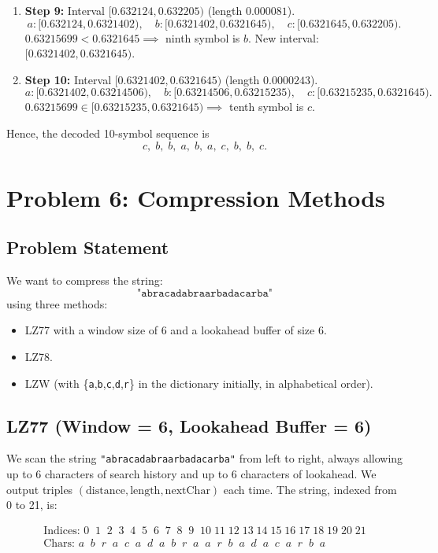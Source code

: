 \documentclass{article}
\begin{document}
\begin{enumerate}
\item \textbf{Step 9:} Interval $[0.632124,0.632205)$ (length $0.000081$).  
  \[
    a:[0.632124,0.6321402),\quad b:[0.6321402,0.6321645),\quad c:[0.6321645,0.632205).
  \]
  $0.63215699 < 0.6321645\implies$ ninth symbol is $b$.  
  New interval: $[0.6321402,0.6321645)$.

\item \textbf{Step 10:} Interval $[0.6321402,0.6321645)$ (length $0.0000243$).  
  \[
    a:[0.6321402,0.63214506),\quad b:[0.63214506,0.63215235),\quad c:[0.63215235,0.6321645).
  \]
  $0.63215699 \in [0.63215235,0.6321645)\implies$ tenth symbol is $c$.
\end{enumerate}

Hence, the decoded 10-symbol sequence is
\[
c,\; b,\; b,\; a,\; b,\; a,\; c,\; b,\; b,\; c.
\]

\section{Problem 6: Compression Methods}

\subsection{Problem Statement}
We want to compress the string:
\[
\texttt{"abracadabraarbadacarba"}
\]
using three methods:
\begin{itemize}
  \item LZ77 with a window size of 6 and a lookahead buffer of size 6.
  \item LZ78.
  \item LZW (with \{\texttt{a},\texttt{b},\texttt{c},\texttt{d},\texttt{r}\} in the dictionary initially, in alphabetical order).
\end{itemize}

\subsection{LZ77 (Window = 6, Lookahead Buffer = 6)}

We scan the string \texttt{"abracadabraarbadacarba"} from left to right, always allowing up to 6 characters of search history and up to 6 characters of lookahead. We output triples $(\mathrm{distance}, \mathrm{length}, \mathrm{nextChar})$ each time. The string, indexed from 0 to 21, is:

\[
\begin{array}{l}
\text{Indices: }0\;\;1\;\;2\;\;3\;\;4\;\;5\;\;6\;\;7\;\;8\;\;9\;\;10\;11\;12\;13\;14\;15\;16\;17\;18\;19\;20\;21\\
\text{Chars:  }a\;\;b\;\;r\;\;a\;\;c\;\;a\;\;d\;\;a\;\;b\;\;r\;\;a\;\;a\;\;r\;\;b\;\;a\;\;d\;\;a\;\;c\;\;a\;\;r\;\;b\;\;a
\end{array}
\]
\end{document}
